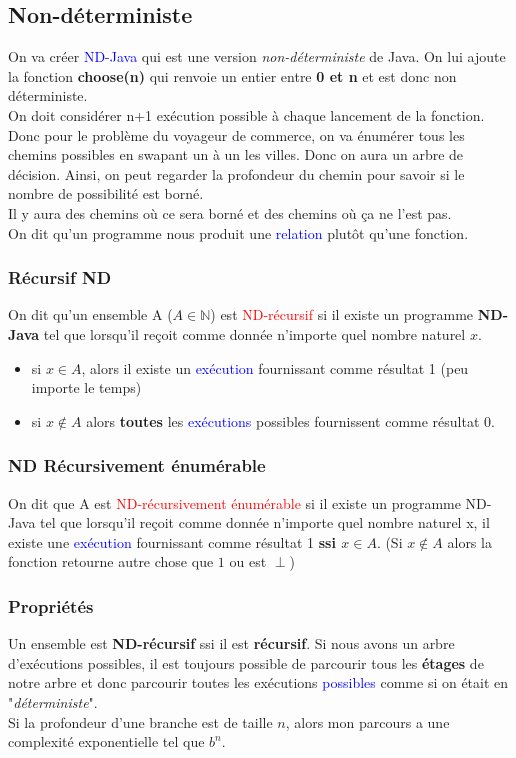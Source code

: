 \documentclass{report}
\begin{document}
\subsection{Non-déterministe}
On va créer \textcolor{blue}{ND-Java} qui est une version \textit{non-déterministe} de Java. On lui ajoute la fonction \textbf{choose(n)} qui renvoie un entier entre \textbf{0 et n} et est donc non déterministe.\\
On doit considérer n+1 exécution possible à chaque lancement de la fonction. \\
Donc pour le problème du voyageur de commerce, on va énumérer tous les chemins possibles en swapant un à un les villes. Donc on aura un arbre de décision. Ainsi, on peut regarder la profondeur du chemin pour savoir si le nombre de possibilité est borné.\\
Il y aura des chemins où ce sera borné et des chemins où ça ne l'est pas.\\
On dit qu'un programme nous produit une \textcolor{blue}{relation} plutôt qu'une fonction.

\subsubsection{Récursif ND}
On dit qu'un ensemble A ($A \in \mathbb{N}$) est \textcolor{red}{ND-récursif} si il existe un programme \textbf{ND-Java} tel que lorsqu'il reçoit comme donnée n'importe quel nombre naturel $x$.
\begin{itemize}
\item si $x \in A$, alors il existe un \textcolor{blue}{exécution} fournissant comme résultat 1 (peu importe le temps)
\item si $x \notin A$ alors \textbf{toutes} les \textcolor{blue}{exécutions} possibles fournissent comme résultat 0.
\end{itemize}

\subsubsection{ND Récursivement énumérable}
On dit que A est \textcolor{red}{ND-récursivement énumérable} si il existe un programme ND-Java tel que lorsqu'il reçoit comme donnée n'importe quel nombre naturel x, il existe une \textcolor{blue}{exécution} fournissant comme résultat 1 \textbf{ssi $x \in A$}. (Si $x \notin A$ alors la fonction retourne autre chose que $1$ ou est $\perp$)

\subsubsection{Propriétés}
Un ensemble est \textbf{ND-récursif} ssi il est \textbf{récursif}. Si nous avons un arbre d'exécutions possibles, il est toujours possible de parcourir tous les \textbf{étages} de notre arbre et donc parcourir toutes les exécutions \textcolor{blue}{possibles} comme si on était en "\textit{déterministe}".\\
Si la profondeur d'une branche est de taille $n$, alors mon parcours a une complexité exponentielle tel que $b^n$.
\end{document}

